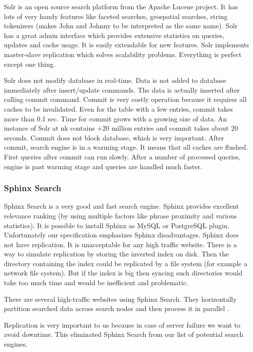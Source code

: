 \documentclass[10pt,a4paper]{article}
\begin{document}
Solr is an open source search platform from the Apache Lucene project. It has lots of very handy features like faceted searches, geospatial searches, string tokenizers (makes John and Johnny to be interpreted as the same name). Solr has a great admin interface which provides extensive statistics on queries, updates and cache usage. It is easily extendable for new features. Solr implements master-slave replication which solves scalability problems. Everything is perfect except one thing. 

Solr does not modify database in real-time. Data is not added to database immediately after insert/update commands. The data is actually inserted after calling commit command. Commit is very costly operation because it requires all caches to be invalidated. Even for the table with a few entries, commit takes more than 0.1 sec. Time for commit grows with a growing size of data. An instance of Solr at nk contains +20 million entries and commit takes about 20 seconds. Commit does not block database, which is very important. After commit, search engine is in a warming stage. It means that all caches are flushed. First queries after commit can run slowly. After a number of processed queries, engine is past warming stage and queries are handled much faster.

\subsubsection{Sphinx Search}

Sphinx Search is a very good and fast search engine. Sphinx provides excellent relevance ranking (by using multiple factors like phrase proximity and various statistics). It is possible to install Sphinx as MySQL or PostgreSQL plugin. Unfortunately our specification emphasizes Sphinx disadvantages.
Sphinx does not have replication. It is unacceptable for any high traffic website. There is a way to simulate replication by storing the inverted index on disk. Then the directory containing the index could be replicated by a file system (for example a network file system). But if the index is big then syncing such directories would take too much time and would be inefficient and problematic.

There are several high-traffic websites using Sphinx Search. They horizontally partition searched data across search nodes and then process it in parallel \cite{SPHINXPARAL}.

Replication is very important to us because in case of server failure we want to avoid downtime. This eliminated Sphinx Search from our list of potential search engines. 
\end{document}

